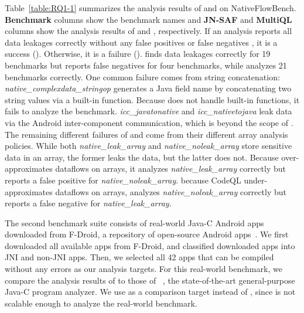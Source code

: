 Table~\ref{table:RQ1-1} summarizes the analysis
results of \jnsaf and \ours on NativeFlowBench.
{\bf Benchmark} columns show the benchmark names
and {\bf JN-SAF} and {\bf MultiQL} columns show 
the analysis results of \jnsaf and \ours, respectively.
If an analysis reports all data leakages correctly without any
false positives  or false negatives , it is a success (\cmark).
Otherwise, it is a failure (\xmark).
\ours finds data leakages correctly for 19 benchmarks but reports false
negatives for four benchmarks, while \jnsaf analyzes 21 benchmarks correctly. 
One common failure comes from string concatenation:
{\it native\_complexdata\_stringop} generates a Java field name by
concatenating two string values via a built-in function.
Because \ours does not handle built-in functions, it fails to analyze the benchmark.
{\it icc\_javatonative} and {\it icc\_nativetojava} leak data via the Android
inter-component communication, which is beyond the scope of \ours.
The remaining different failures of \ours and \jnsaf come from
their different array analysis policies.
While both {\it native\_leak\_array} and {\it native\_noleak\_array} store sensitive data in an array,
the former leaks the data, but the latter does not.
Because \jnsaf over-approximates dataflows on arrays,
it analyzes {\it native\_leak\_array} correctly but reports a false positive for {\it native\_noleak\_array}.
 because CodeQL under-approximates dataflows on arrays,
\ours analyzes {\it native\_noleak\_array} correctly but reports a false negative for
{\it native\_leak\_array}.


The second benchmark suite consists of real-world Java-C Android apps downloaded from
F-Droid, a repository of open-source Android apps~\cite{fdroid}.  We first
downloaded all available apps from F-Droid, and classified downloaded apps into JNI and non-JNI apps.
Then, we selected all 42 apps that can be compiled without any errors as our analysis targets.
For this real-world benchmark, we compare the analysis results of
\ours to those of \lees~\cite{LeeASE20},
the state-of-the-art general-purpose Java-C program analyzer.
We use \lees as a comparison target instead of \jnsaf,
since \jnsaf is not scalable enough to analyze the real-world benchmark.



